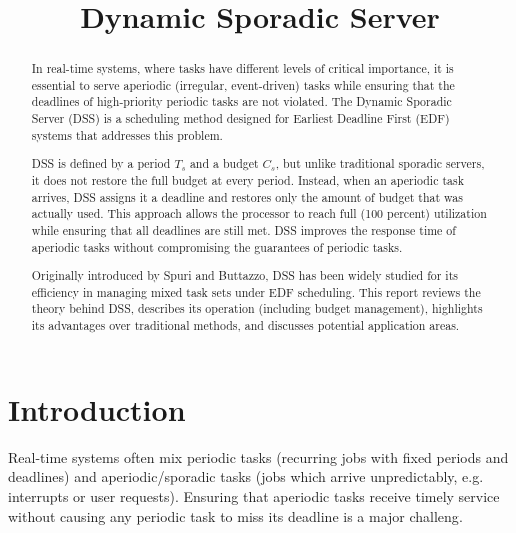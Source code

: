 \documentclass[conference]{IEEEtran}
\begin{document}
\title{ Dynamic Sporadic Server\\

}

\author{

}

\maketitle

\begin{abstract}
In real-time systems, where tasks have different levels of critical importance, it is essential to serve aperiodic (irregular, event-driven) tasks while ensuring that the deadlines of high-priority periodic tasks are not violated. The Dynamic Sporadic Server (DSS) is a scheduling method designed for Earliest Deadline First (EDF) systems that addresses this problem. 

DSS is defined by a period  $T_s$ and a budget $C_s$, but unlike traditional sporadic servers, it does not restore the full budget at every period. Instead, when an aperiodic task arrives, DSS assigns it a deadline and restores only the amount of budget that was actually used. This approach allows the processor to reach full (100 percent) utilization while ensuring that all deadlines are still met. DSS improves the response time of aperiodic tasks without compromising the guarantees of periodic tasks.

Originally introduced by Spuri and Buttazzo\cite{spuri1994efficient}, DSS has been widely studied for its efficiency in managing mixed task sets under EDF scheduling. This report reviews the theory behind DSS, describes its operation (including budget management), highlights its advantages over traditional methods, and discusses potential application areas.
 
\end{abstract}

\section{Introduction}
Real-time systems often mix periodic tasks (recurring jobs with fixed periods and deadlines) and aperiodic/sporadic tasks (jobs which arrive unpredictably, e.g. interrupts or user requests). Ensuring that aperiodic tasks receive timely service without causing any periodic task to miss its deadline is a major challeng\cite{laplante2011real}. 
\end{document}
